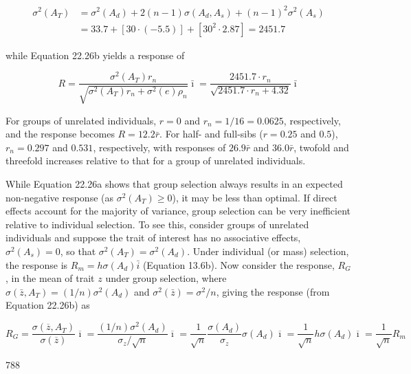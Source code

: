\documentclass{article}
\begin{document}
\begin{equation}
\begin{aligned}\sigma^{2}(A_{T})&=\sigma^{2}(A_{d})+2(n-1)\sigma(A_{d},A_{s})+(n-1)^{2}\sigma^{2}(A_{s})\\&=33.7+\left[30\cdot(-5.5)\right]+\left[30^{2}\cdot2.87\right]=2451.7\end{aligned}
\end{equation}

while Equation 22.26b yields a response of

\begin{equation}
R=\frac{\sigma^{2}(A_{T})r_{n}}{\sqrt{\sigma^{2}(A_{T})r_{n}+\sigma^{2}(e)\rho_{n}}}\bar{\imath}=\frac{2451.7\cdot r_{n}}{\sqrt{2451.7\cdot r_{n}+4.32}}\bar{\imath}
\end{equation}

For groups of unrelated individuals, $r = 0$ and $r_n = 1/16 = 0.0625$, respectively, and the response becomes $R = 12.2\bar{r}$. For half- and full-sibs ($r = 0.25$ and $0.5$), $r_n = 0.297$ and $0.531$, respectively, with responses of $26.9\bar{r}$ and $36.0\bar{r}$, twofold and threefold increases relative to that for a group of unrelated individuals.

While Equation 22.26a shows that group selection always results in an expected non-negative response (as  $ \sigma^2(A_T) \geq 0 $), it may be less than optimal. If direct effects account for the majority of variance, group selection can be very inefficient relative to individual selection. To see this, consider groups of unrelated individuals and suppose the trait of interest has no associative effects,  $ \sigma^2(A_s) = 0 $, so that  $ \sigma^2(A_T) = \sigma^2(A_d) $. Under individual (or mass) selection, the response is  $ R_m = h\sigma(A_d) \bar{i} $ (Equation 13.6b). Now consider the response,  $ R_G $, in the mean of trait  $ z $ under group selection, where  $ \sigma(\bar{z}, A_T) = (1/n)\sigma^2(A_d) $ and  $ \sigma^2(\bar{z}) = \sigma^2/n $, giving the response (from Equation 22.26b) as

\begin{equation}
R_{G}=\frac{\sigma(\overline{z},A_{T})}{\sigma(\overline{z})}\overline{\imath}=\frac{(1/n)\sigma^{2}(A_{d})}{\sigma_{z}/\sqrt{n}}\overline{\imath}=\frac{1}{\sqrt{n}}\frac{\sigma(A_{d})}{\sigma_{z}}\sigma(A_{d})\overline{\imath}=\frac{1}{\sqrt{n}}h\sigma(A_{d})\overline{\imath}=\frac{1}{\sqrt{n}}R_{m}
\end{equation}

788
\end{document}
